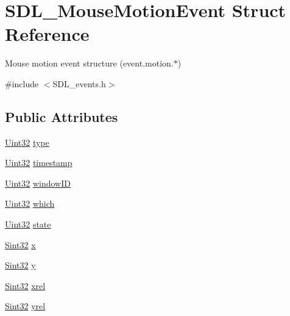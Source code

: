 \hypertarget{struct_s_d_l___mouse_motion_event}{\section{S\-D\-L\-\_\-\-Mouse\-Motion\-Event Struct Reference}
\label{struct_s_d_l___mouse_motion_event}
}


Mouse motion event structure (event.\-motion.$\ast$)  




{\ttfamily \#include $<$S\-D\-L\-\_\-events.\-h$>$}

\subsection*{Public Attributes}
\begin{DoxyCompactItemize}
\item 
\hyperlink{_s_d_l__stdinc_8h_add440eff171ea5f55cb00c4a9ab8672d}{Uint32} \hyperlink{struct_s_d_l___mouse_motion_event_a431dd28cd6db6a7335cf633dbeb80cfb}{type}
\item 
\hyperlink{_s_d_l__stdinc_8h_add440eff171ea5f55cb00c4a9ab8672d}{Uint32} \hyperlink{struct_s_d_l___mouse_motion_event_af530bc0ef327ea6d497c5b1da119841c}{timestamp}
\item 
\hyperlink{_s_d_l__stdinc_8h_add440eff171ea5f55cb00c4a9ab8672d}{Uint32} \hyperlink{struct_s_d_l___mouse_motion_event_aa9976725242ada93a9e18e7fdf5796e6}{window\-I\-D}
\item 
\hyperlink{_s_d_l__stdinc_8h_add440eff171ea5f55cb00c4a9ab8672d}{Uint32} \hyperlink{struct_s_d_l___mouse_motion_event_a6f04c17b4305683915e2fd2dc3c36dbc}{which}
\item 
\hyperlink{_s_d_l__stdinc_8h_add440eff171ea5f55cb00c4a9ab8672d}{Uint32} \hyperlink{struct_s_d_l___mouse_motion_event_a3f6e9bad9d959b824881ba09e05b7024}{state}
\item 
\hyperlink{_s_d_l__stdinc_8h_a7a90b941db9d4582e9ad7abb9940ff7e}{Sint32} \hyperlink{struct_s_d_l___mouse_motion_event_a36398bb4a5308446a262b0bfc8baa80a}{x}
\item 
\hyperlink{_s_d_l__stdinc_8h_a7a90b941db9d4582e9ad7abb9940ff7e}{Sint32} \hyperlink{struct_s_d_l___mouse_motion_event_a7e6a7b1f8713d1968dc913908e8ea448}{y}
\item 
\hyperlink{_s_d_l__stdinc_8h_a7a90b941db9d4582e9ad7abb9940ff7e}{Sint32} \hyperlink{struct_s_d_l___mouse_motion_event_a1c01d9aba2a20778fb45a15dca39ef58}{xrel}
\item 
\hyperlink{_s_d_l__stdinc_8h_a7a90b941db9d4582e9ad7abb9940ff7e}{Sint32} \hyperlink{struct_s_d_l___mouse_motion_event_a7674c8b92d039ab948f671a180fa7b30}{yrel}
\end{DoxyCompactItemize}


